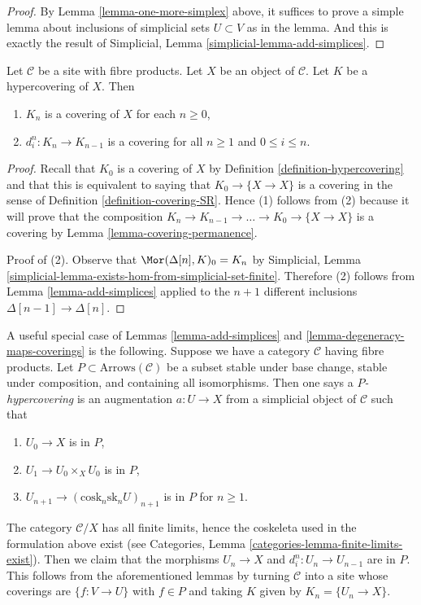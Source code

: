 \begin{proof}
By Lemma \ref{lemma-one-more-simplex}
above, it suffices to prove a simple lemma
about inclusions of simplicial sets $U \subset V$ as in the
lemma. And this is exactly the result of
Simplicial, Lemma \ref{simplicial-lemma-add-simplices}.
\end{proof}

\begin{lemma}
\label{lemma-degeneracy-maps-coverings}
Let $\mathcal{C}$ be a site with fibre products. Let $X$ be an object of
$\mathcal{C}$. Let $K$ be a hypercovering of $X$. Then
\begin{enumerate}
\item $K_n$ is a covering of $X$ for each $n \geq 0$,
\item $d^n_i : K_n \to K_{n - 1}$ is a covering for all $n \geq 1$
and $0 \leq i \leq n$.
\end{enumerate}
\end{lemma}

\begin{proof}
Recall that $K_0$ is a covering of $X$ by
Definition \ref{definition-hypercovering}
and that this is equivalent to saying that
$K_0 \to \{X \to X\}$ is a covering in the sense
of Definition \ref{definition-covering-SR}.
Hence (1) follows from (2) because it will prove that
the composition
$K_n \to K_{n - 1} \to \ldots \to K_0 \to \{X \to X\}$
is a covering by Lemma \ref{lemma-covering-permanence}.

\medskip\noindent
Proof of (2). Observe that
$\Mor(\Delta[n], K)_0 = K_n$ by
Simplicial, Lemma \ref{simplicial-lemma-exists-hom-from-simplicial-set-finite}.
Therefore (2) follows from Lemma \ref{lemma-add-simplices}
applied to the $n + 1$ different inclusions $\Delta[n - 1] \to \Delta[n]$.
\end{proof}

\begin{remark}
\label{remark-P-covering}
A useful special case of Lemmas \ref{lemma-add-simplices} and
\ref{lemma-degeneracy-maps-coverings} is the following.
Suppose we have a category $\mathcal{C}$ having fibre products.
Let $P \subset \text{Arrows}(\mathcal{C})$ be a subset
stable under base change, stable under composition,
and containing all isomorphisms. Then one says a
{\it $P$-hypercovering} is an augmentation $a : U \to X$
from a simplicial object of $\mathcal{C}$ such that
\begin{enumerate}
\item $U_0 \to X$ is in $P$,
\item $U_1 \to U_0 \times_X U_0$ is in $P$,
\item $U_{n + 1} \to (\text{cosk}_n\text{sk}_n U)_{n + 1}$
is in $P$ for $n \geq 1$.
\end{enumerate}
The category $\mathcal{C}/X$ has all finite limits, hence the
coskeleta used in the formulation above exist
(see Categories, Lemma \ref{categories-lemma-finite-limits-exist}).
Then we claim that the morphisms $U_n \to X$ and $d^n_i : U_n \to U_{n - 1}$
are in $P$. This follows from the aforementioned
lemmas by turning $\mathcal{C}$ into a site whose coverings
are $\{f : V \to U\}$ with $f \in P$ and taking $K$ given by
$K_n = \{U_n \to X\}$.
\end{remark}


